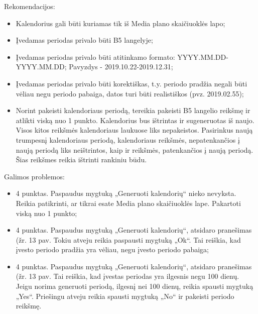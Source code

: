 \bigskip
Rekomendacijos:
\begin{itemize}
    \itemsep0em 
    \item Kalendorius gali būti kuriamas tik iš Media plano skaičiuoklės lapo;
    \item Įvedamas periodas privalo būti B5 langelyje;
    \item Įvedamas periodas privalo būti atitinkamo formato: YYYY.MM.DD-YYYY.MM.DD; Pavyzdys - 2019.10.22-2019.12.31;
    \item Įvedamas periodas privalo būti korektiškas, t.y. periodo pradžia negali būti vėliau negu periodo pabaiga, datos turi būti realistiškos (pvz. 2019.02.55);
    \item Norint pakeisti kalendoriaus periodą, tereikia pakeisti B5 langelio reikšmę ir atlikti viską nuo 1 punkto. Kalendorius bus ištrintas ir sugeneruotas iš naujo. Visos kitos reikšmės kalendoriaus laukuose liks nepakeistos. Pasirinkus naują trumpesnį kalendoriaus periodą, kalendoriaus reikšmės, nepatenkančios į naują periodą liks neištrintos, kaip ir reikšmės, patenkančios į naują periodą. Šias reikšmes reikia ištrinti rankiniu būdu.
\end{itemize}

\bigskip
Galimos problemos:
\begin{itemize}
    \itemsep0em 
    \item 4 punktas. Paspaudus mygtuką „Generuoti kalendorių“ nieko nevyksta. Reikia patikrinti, ar tikrai esate Media plano skaičiuoklės lape. Pakartoti viską nuo 1 punkto;
    \item 4 punktas. Paspaudus mygtuką „Generuoti kalendorių“, atsidaro pranešimas (žr. 13 pav. Tokiu atveju reikia paspausti mygtuką „Ok“. Tai reiškia, kad įvesto periodo pradžia yra vėliau, negu įvesto periodo pabaiga;
    \item 4 punktas. Paspaudus mygtuką „Generuoti kalendorių“, atsidaro pranešimas (žr. 13 pav. Tai reiškia, kad įvestas periodas yra ilgesnis negu 100 dienų. Jeigu norima generuoti periodą, ilgesnį nei 100 dienų, reikia spausti mygtuką „Yes“. Priešingu atveju reikia spausti mygtuką „No“ ir pakeisti periodo reikšmę.
\end{itemize}

